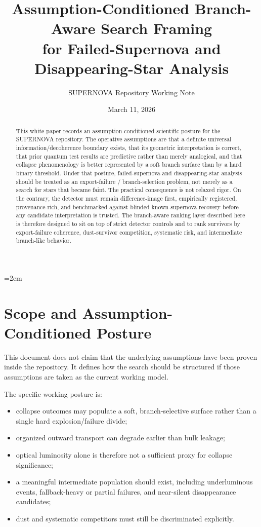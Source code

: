 \documentclass[11pt]{article}
\title{Assumption-Conditioned Branch-Aware Search Framing\\for Failed-Supernova and Disappearing-Star Analysis}
\author{SUPERNOVA Repository Working Note}
\date{March 11, 2026}
\begin{document}
\emergencystretch=2em
\maketitle

\begin{abstract}
This white paper records an assumption-conditioned scientific posture for the SUPERNOVA repository. The operative assumptions are that a definite universal information/decoherence boundary exists, that its geometric interpretation is correct, that prior quantum test results are predictive rather than merely analogical, and that collapse phenomenology is better represented by a soft branch surface than by a hard binary threshold. Under that posture, failed-supernova and disappearing-star analysis should be treated as an export-failure / branch-selection problem, not merely as a search for stars that became faint. The practical consequence is not relaxed rigor. On the contrary, the detector must remain difference-image first, empirically registered, provenance-rich, and benchmarked against blinded known-supernova recovery before any candidate interpretation is trusted. The branch-aware ranking layer described here is therefore designed to sit on top of strict detector controls and to rank survivors by export-failure coherence, dust-survivor competition, systematic risk, and intermediate branch-like behavior.
\end{abstract}

\section{Scope and Assumption-Conditioned Posture}

This document does not claim that the underlying assumptions have been proven inside the repository. It defines how the search should be structured if those assumptions are taken as the current working model.

The specific working posture is:
\begin{itemize}[leftmargin=1.5em]
\item collapse outcomes may populate a soft, branch-selective surface rather than a single hard explosion/failure divide;
\item organized outward transport can degrade earlier than bulk leakage;
\item optical luminosity alone is therefore not a sufficient proxy for collapse significance;
\item a meaningful intermediate population should exist, including underluminous events, fallback-heavy or partial failures, and near-silent disappearance candidates;
\item dust and systematic competitors must still be discriminated explicitly.
\end{itemize}
\end{document}
